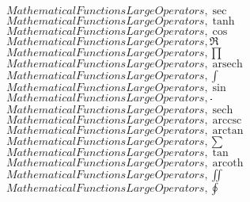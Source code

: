 \documentclass{article}
\begin{document}
\linebreak
$Mathematical Functions Large Operators,\sec$
\linebreak
\linebreak
$Mathematical Functions Large Operators,\tanh$
\linebreak
\linebreak
$Mathematical Functions Large Operators,\cos$
\linebreak
\linebreak
$Mathematical Functions Large Operators,\Re$
\linebreak
\linebreak
$Mathematical Functions Large Operators,\prod$
\linebreak
\linebreak
$Mathematical Functions Large Operators,\operatorname{arsech}$
\linebreak
\linebreak
$Mathematical Functions Large Operators,\int$
\linebreak
\linebreak
$Mathematical Functions Large Operators,\sin$
\linebreak
\linebreak
$Mathematical Functions Large Operators,\frac{\;}{\;}$
\linebreak
\linebreak
$Mathematical Functions Large Operators,\operatorname{sech}$
\linebreak
\linebreak
$Mathematical Functions Large Operators,\operatorname{arccsc}$
\linebreak
\linebreak
$Mathematical Functions Large Operators,\arctan$
\linebreak
\linebreak
$Mathematical Functions Large Operators,\sum$
\linebreak
\linebreak
$Mathematical Functions Large Operators,\tan$
\linebreak
\linebreak
$Mathematical Functions Large Operators,\operatorname{arcoth}$
\linebreak
\linebreak
$Mathematical Functions Large Operators,\iint$
\linebreak
\linebreak
$Mathematical Functions Large Operators,\oint$
\linebreak
\linebreak
\end{document}

